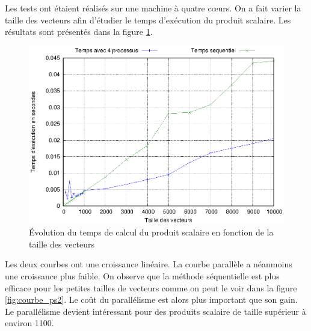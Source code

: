\documentclass[a4paper]{article}
\begin{document}
Les tests ont étaient réalisés sur une machine à quatre cœurs. On a fait varier la taille des vecteurs afin d'étudier le temps d'exécution du produit scalaire. Les résultats sont présentés dans la figure \ref{fig:courbe_ps}.

\begin{figure}[h!]
	\begin{center}
		\includegraphics[scale=0.80]{Courbes/produit_scal_temps_taille.eps}
	\end{center}
	\caption{Évolution du temps de calcul du produit scalaire en fonction de la taille des vecteurs}
	\label{fig:courbe_ps}
\end{figure}

\FloatBarrier

Les deux courbes ont une croissance linéaire. La courbe parallèle a néanmoins une croissance plus faible. On observe que la méthode séquentielle est plus efficace pour les petites tailles de vecteurs comme on peut le voir dans la figure \ref{fig:courbe_ps2}.
Le coût du parallélisme est alors plus important que son gain. Le parallélisme devient intéressant pour des produits scalaire de taille supérieur à environ 1100.
\end{document}
